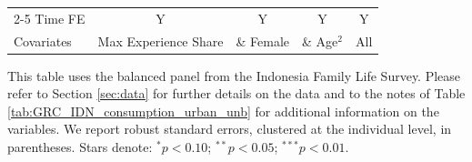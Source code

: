 \begin{table}[htbp]
\begin{threeparttable}
\begin{tabular}{l cccc}
\cmidrule{2-5} Time FE & Y & Y & Y & Y \\ Covariates & Max Experience Share & \& Female & \& Age$^2$ & All \\ \bottomrule \end{tabular} \begin{tablenotes}[flushleft] \footnotesize \item{This table uses the balanced panel from the Indonesia Family Life Survey. Please refer to Section \ref{sec:data} for further details on the data and to the notes of Table \ref{tab:GRC_IDN_consumption_urban_unb} for additional information on the variables. We report robust standard errors, clustered at the individual level, in parentheses. Stars denote: $^{*} p<0.10$; $^{**} p<0.05$; $^{***} p<0.01$.} \end{tablenotes} \end{threeparttable} \end{table}
